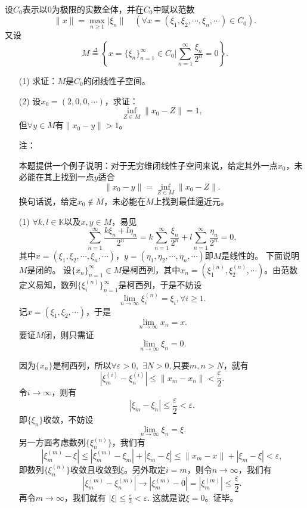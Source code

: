 \begin{exercise}
\hfill\\
设$C_0$表示以0为极限的实数全体，并在$C_0$中赋以范数
$$\|x\|=\max_{n\geq1}|\xi_n\|\quad(\forall x=(\xi_1,\xi_2,\cdots,\xi_n,\cdots)\in C_0).$$
又设$$M\overset{\Delta}{=}\left\{x=\{\xi_n\}_{n=1}^{\infty}\in C_0|\sum_{n=1}^{\infty}\frac{\xi_n}{2^n}=0\right\}.$$
\begin{enumerate}
\item[(1)] 求证：$M$是$C_0$的闭线性子空间。
\item[(2)] 设$x_0=(2,0,0,\cdots)$，求证：
\begin{equation}
\inf_{Z\in M}\|x_0-Z\|=1,
\end{equation}
但$\forall y\in M$有$\|x_0-y\|>1$。

注： 

本题提供一个例子说明：对于无穷维闭线性子空间来说，给定其外一点$x_0$，未必能在其上找到一点$y$适合
$$\|x_0-y\|=\inf_{Z\in M}\|x_0-Z\|.$$
换句话说，给定$x_0\not\in M$，未必能在$M$上找到最佳逼近元。
\end{enumerate}

\begin{enumerate}
\item[(1)] $\forall k,l\in\mathbb{K}$以及$x,y\in M$，易见
$$\sum_{n=1}^{\infty}\frac{k\xi_n+l\eta_n}{2^n}=k\sum_{n=1}^{\infty}\frac{\xi_n}{2^n}+l\sum_{n=1}^{\infty}\frac{\eta_n}{2^n}=0,$$
其中$x=(\xi_1,\xi_2,\cdots,\xi_n,\cdots)$，$y=(\eta_1,\eta_2,\cdots,\eta_n,\cdots)$即$M$是线性的。
下面说明$M$是闭的。
设$\{x_n\}_{n=1}^{\infty}\in M$是柯西列，其中$x_n=(\xi^{(n)}_1,\xi^{(n)}_2,\cdots)$。由范数定义易知，数列$\{\xi_i^{(n)}\}_{n=1}^{\infty}$是柯西列，于是不妨设
$$\lim_{n\to\infty}\xi_i^{(n)}=\xi_i,\forall i\geq1.$$
记$x=(\xi_1,\xi_2,\cdots)$，于是
$$\lim_{n\to\infty}x_n=x.$$
要证$M$闭，则只需证$$\lim_{n\to\infty}\xi_n=0.$$

因为$\{x_n\}$是柯西列，所以$\forall\varepsilon>0,$ $\exists N>0,$只要$m,n>N$，就有
$$|\xi_m^{(i)}-\xi_n^{(i)}|\leq\|x_m-x_n\|<\frac{\varepsilon}{2}.$$
令$i\to\infty$，则有
$$|\xi_m-\xi_n|\leq\frac{\varepsilon}2<\varepsilon.$$
即$\{\xi_n\}$收敛，不妨设
$$\lim_{n\to\infty}\xi_n=\xi.$$
另一方面考虑数列$\{\xi_n^{(n)}\}$，我们有
$$|\xi_m^{(m)}-\xi|\leq|\xi_m^{(m)}-\xi_m|+|\xi_m-\xi|\leq\|x_m-x\|+|\xi_m-\xi|<\varepsilon,$$
即数列$\{\xi_n^{(n)}\}$收敛且收敛到$\xi$。另外取定$i=m$，则令$n\to\infty$，我们有$$|\xi_m^{(m)}-\xi_n^{(m)}|\to|\xi_m^{(m)}-0|=|\xi_m^{(m)}|\leq\frac{\varepsilon}2.$$再令$m\to\infty$，我们就有
$|\xi|\leq\frac{\varepsilon}{2}<\varepsilon.$
这就是说$\xi=0$。证毕。


\end{enumerate}
\end{exercise}
